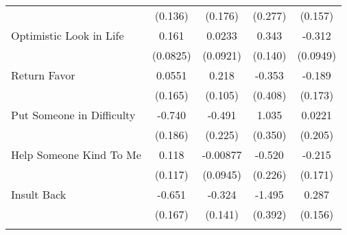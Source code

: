 {\begin{tabular}{l*{4}{c}}
            &     (0.136)         &     (0.176)         &     (0.277)         &     (0.157)         \\
[1em]
Optimistic Look in Life&       0.161         &      0.0233         &       0.343\sym{*}  &      -0.312\sym{**} \\
            &    (0.0825)         &    (0.0921)         &     (0.140)         &    (0.0949)         \\
[1em]
Return Favor&      0.0551         &       0.218\sym{*}  &      -0.353         &      -0.189         \\
            &     (0.165)         &     (0.105)         &     (0.408)         &     (0.173)         \\
[1em]
Put Someone in Difficulty&      -0.740\sym{***}&      -0.491\sym{*}  &       1.035\sym{**} &      0.0221         \\
            &     (0.186)         &     (0.225)         &     (0.350)         &     (0.205)         \\
[1em]
Help Someone Kind To Me&       0.118         &    -0.00877         &      -0.520\sym{*}  &      -0.215         \\
            &     (0.117)         &    (0.0945)         &     (0.226)         &     (0.171)         \\
[1em]
Insult Back &      -0.651\sym{***}&      -0.324\sym{*}  &      -1.495\sym{***}&       0.287         \\
            &     (0.167)         &     (0.141)         &     (0.392)         &     (0.156)         \\
\hline\hline
{}\\
\end{tabular}
}
